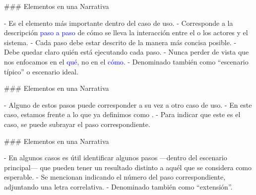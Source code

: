### Elementos en una Narrativa

\newline

- Es el elemento más importante dentro del caso de uso.
- Corresponde a la descripción \textcolor{blue}{paso a paso} de cómo se lleva la interacción
entre el o los actores y el sistema.
- Cada paso debe estar descrito de la manera más concisa posible.
- Debe quedar claro quién está ejecutando cada paso.
- Nunca perder de vista que nos enfocamos en el \textcolor{blue}{qué}, no en el \textcolor{blue}{cómo}.
- Denominado también como ``escenario típico'' o escenario ideal.

### Elementos en una Narrativa

\newline

- Alguno de estos pasos puede corresponder a su vez a otro caso de uso.
    - En este caso, estamos frente a lo que ya definimos como .
    - Para indicar que este es el caso, se puede subrayar el paso correspondiente.


### Elementos en una Narrativa

\newline

- En algunos casos es útil identificar algunos pasos ---dentro del escenario principal--- que
pueden tener un resultado distinto a aquél que se considera como esperable.
- Se mencionan indicando el número del paso correspondiente, adjuntando una letra correlativa.
- Denominado también como ``extensión''.

